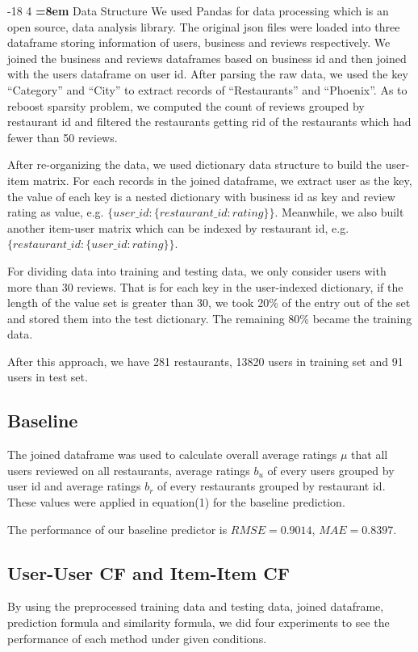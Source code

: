 \documentclass{llncs}
\makeatletter
\renewcommand\subsubsection{\@startsection{subsubsection}{3}{\z@}%
	{-18\p@ \@plus -4\p@ \@minus -4\p@}%
	{4\p@ \@plus 2\p@ \@minus 2\p@}%
	{\normalfont\normalsize\bfseries\boldmath
		\rightskip=\z@ \@plus 8em\pretolerance=10000 }}
\makeatother
\begin{document}
\subsubsection{Data Structure}
We used Pandas for data processing which is an open source, data analysis library. The original json files were loaded into three dataframe storing information of users, business and reviews respectively. We joined the business and reviews dataframes based on business id and then joined with the users dataframe on user id. After parsing the raw data, we used the key ``Category'' and ``City'' to extract records of ``Restaurants'' and ``Phoenix''. As to reboost sparsity problem, we computed the count of reviews grouped by restaurant id and filtered the restaurants getting rid of the restaurants which had fewer than 50 reviews. 

After re-organizing the data, we used dictionary data structure to build the user-item matrix. For each records in the joined dataframe, we extract user as the key, the value of each key is a nested dictionary with business id as key and review rating as value, e.g. $\{user\_id: \{restaurant\_id: rating\}\}$. Meanwhile, we also built another item-user matrix which can be indexed by restaurant id, e.g. $\{restaurant\_id: \{user\_id: rating\}\}$.

For dividing data into training and testing data, we only consider users with more than 30 reviews. That is for each key in the user-indexed dictionary, if the length of the value set is greater than 30, we took 20\% of the entry out of the set and stored them into the test dictionary. The remaining 80\% became the training data. 

After this approach, we have 281 restaurants, 13820 users in training set and 91 users in test set.
\subsection{Baseline}
The joined dataframe was used to calculate overall average ratings $\mu$ that all users reviewed on all restaurants, average ratings $b_u$ of every users grouped by user id and average ratings $b_r$ of every restaurants grouped by restaurant id. These values were applied in equation(1) for the baseline prediction.

The performance of our baseline predictor is $RMSE = 0.9014 $, $MAE = 0.8397$.

\subsection{User-User CF and Item-Item CF}
By using the preprocessed training data and testing data, joined dataframe, prediction formula and similarity formula, we did four experiments to see the performance of each method under given conditions.   
\end{document}
